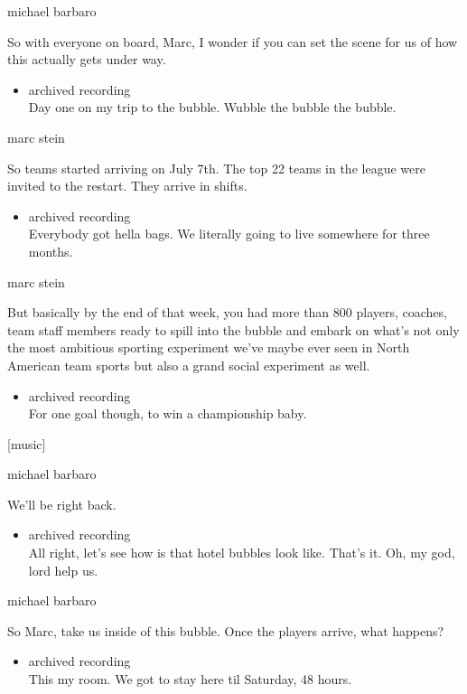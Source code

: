 michael barbaro

So with everyone on board, Marc, I wonder if you can set the scene for
us of how this actually gets under way.

\begin{itemize}
\tightlist
\item
  archived recording\\
  Day one on my trip to the bubble. Wubble the bubble the bubble.
\end{itemize}

marc stein

So teams started arriving on July 7th. The top 22 teams in the league
were invited to the restart. They arrive in shifts.

\begin{itemize}
\tightlist
\item
  archived recording\\
  Everybody got hella bags. We literally going to live somewhere for
  three months.
\end{itemize}

marc stein

But basically by the end of that week, you had more than 800 players,
coaches, team staff members ready to spill into the bubble and embark on
what's not only the most ambitious sporting experiment we've maybe ever
seen in North American team sports but also a grand social experiment as
well.

\begin{itemize}
\tightlist
\item
  archived recording\\
  For one goal though, to win a championship baby.
\end{itemize}

{[}music{]}

michael barbaro

We'll be right back.

\begin{itemize}
\tightlist
\item
  archived recording\\
  All right, let's see how is that hotel bubbles look like. That's it.
  Oh, my god, lord help us.
\end{itemize}

michael barbaro

So Marc, take us inside of this bubble. Once the players arrive, what
happens?

\begin{itemize}
\tightlist
\item
  archived recording\\
  This my room. We got to stay here til Saturday, 48 hours.
\end{itemize}

